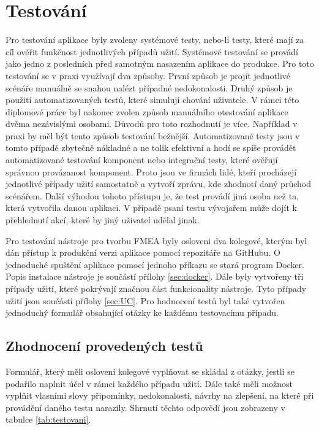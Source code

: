 \section{Testování}
Pro testování aplikace byly zvoleny systémové testy, nebo-li testy, které mají za cíl ověřit funkčnost jednotlivých případů užití. Systémové testování se provádí jako jedno z posledních před samotným nasazením aplikace do produkce. Pro toto testování se v praxi využívají dva způsoby. První způsob je projít jednotlivé scénáře manuálně se snahou nalézt případné nedokonalosti. Druhý způsob je použití automatizovaných testů, které simulují chování uživatele. V rámci této diplomové práce byl nakonec zvolen způsob manuálního otestování aplikace dvěma nezávislými osobami. Důvodů pro toto rozhodnutí je více. Například v praxi by měl být tento způsob testování bežnější. Automatizované testy jsou v tomto případě zbytečně nákladné a ne tolik efektivní a hodí se spíše provádět automatizované testování komponent nebo integrační testy, které ověřují správnou provázanost komponent. Proto jsou ve firmách lidé, kteří procházejí jednotlivé případy užití samostatně a vytvoří zprávu, kde zhodnotí daný průchod scénářem. Další výhodou tohoto přístupu je, že test provádí jiná osoba než ta, která vytvořila danou aplikaci. V případě psaní testu vývojařem může dojít k přehlednutí akcí, které by jiný uživatel udělal jinak. 

Pro testování nástroje pro tvorbu FMEA byly osloveni dva kolegové, kterým byl dán přístup k produkční verzi aplikace pomocí repozitáře na GitHubu. O jednoduché spuštění aplikace pomocí jednoho příkazu se stará program Docker. Popis instalace nástroje je součástí přílohy \ref{sec:docker}. Dále byly vytvořeny tři případy užití, které pokrývají značnou část funkcionality nástroje. Tyto případy užití jsou součástí přílohy \ref{sec:UC}. Pro hodnocení testů byl také vytvořen jednoduchý formulář obsahující otázky ke každému testovacímu případu. 

\subsection{Zhodnocení provedených testů}
Formulář, který měli oslovení kolegové vyplňovat se skládal z otázky, jestli se podařilo naplnit účel v rámci každého případu užití. Dále také měli možnost vyplňit vlasními slovy připomínky, nedokonalosti, návrhy na zlepšení, na které při provádění daného testu narazily. Shrnutí těchto odpovědí jsou zobrazeny v tabulce \ref{tab:testovani}. 

